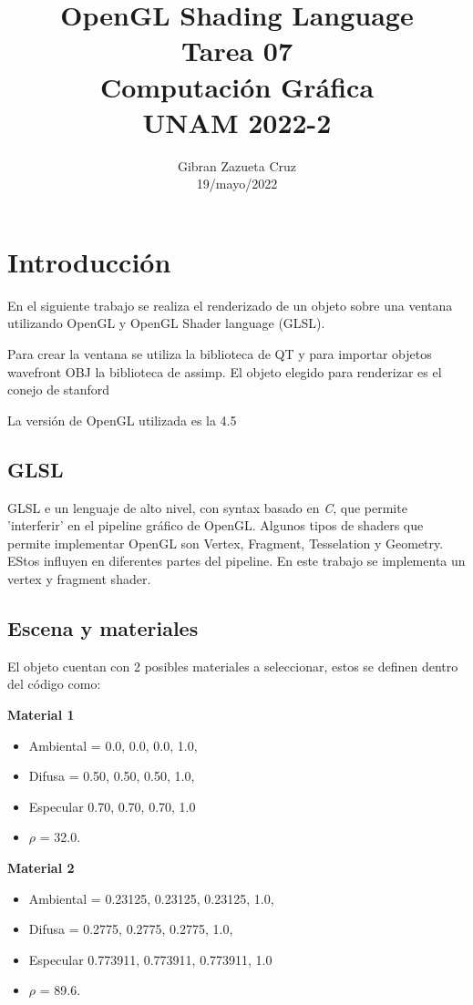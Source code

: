 \documentclass[12pt]{article}
\title{%
  OpenGL Shading Language\\
  \large Tarea 07 \\
    \Large Computación Gráfica\\
     \large UNAM 2022-2}
\author{Gibran Zazueta Cruz \\
\small 19/mayo/2022}
\date{}
\begin{document}
\maketitle

\section{Introducción}

En el siguiente trabajo se realiza el renderizado de un objeto sobre una ventana utilizando OpenGL y OpenGL Shader language (GLSL).

Para crear la ventana se utiliza la biblioteca de QT y para importar objetos wavefront OBJ la biblioteca de assimp. El objeto elegido para renderizar es el conejo de stanford

La versión de OpenGL utilizada es la 4.5

\subsection{GLSL}
GLSL e un lenguaje de alto nivel, con syntax basado en \textit{C}, que permite 'interferir' en el pipeline gráfico de OpenGL.
Algunos tipos de shaders que permite implementar OpenGL son Vertex, Fragment, Tesselation y Geometry. EStos influyen en diferentes partes del pipeline.
En este trabajo se implementa un vertex y fragment shader.

\subsection{Escena y materiales}

El objeto cuentan con 2 posibles materiales a seleccionar, estos se definen dentro del código como:

\textbf{Material 1}
\begin{itemize}
\item Ambiental = {0.0, 0.0, 0.0, 1.0},
\item Difusa = {0.50, 0.50, 0.50, 1.0},
\item Especular {0.70, 0.70, 0.70, 1.0} 
\item $\rho$ = 32.0.
\end{itemize}


\textbf{Material 2}
\begin{itemize}
\item Ambiental = {0.23125, 0.23125, 0.23125, 1.0},
\item Difusa = {0.2775, 0.2775, 0.2775, 1.0},
\item Especular {0.773911, 0.773911, 0.773911, 1.0}
\item $\rho$ = 89.6.
\end{itemize}
\end{document}
